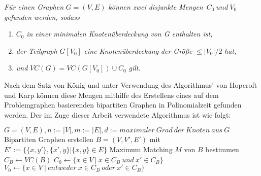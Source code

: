\textit{Für einen Graphen} $G=(V,E)$ \textit{können zwei disjunkte Mengen}\ $C_{0}\ und\ V_{0}$ \textit{gefunden werden, sodass}
\begin{enumerate}
\item $C_{0}$ \textit{ in einer minimalen Knotenüberdeckung von G enthalten ist,}
\item \textit{der Teilgraph }$G[V_{0}]$ \textit{eine Knotenüberdeckung} \textit{der Größe} $\leq |V_{0}| / 2$ \textit{ hat,}
\item \textit{und} $VC(G) = VC(G[V_{0}])\cup C_{0}$ \textit{ gilt.}
\end{enumerate}
Nach dem Satz von König und unter Verwendung des Algorithmus' von Hopcroft und Karp \cite{paper:6} können diese Mengen mithilfe des Erstellens eines auf dem Problemgraphen basierenden bipartiten Graphen in Polinomialzeit gefunden werden. Der im Zuge dieser Arbeit verwendete Algorithmus ist wie folgt:

\begin{algorithm}[caption={Nemhauser-Totter-Regel.}, label={alg1}]
$G = (V, E), n:= |V|, m:=|E|, d:= maximaler\ Grad\ der\ Knoten\ aus\ G$
Bipartiten Graphen erstellen $B = (V, V', E')$ 
  mit $E':= \{\{x,y'\}, \{x', y\} | \{x,y\} \in E\}$ 
Maximum Matching $M$ von $B$ bestimmen 
$C_{B} \leftarrow VC(B)$ 
$C_{0} \leftarrow \{x \in V\ |\ x \in C_{B}\ und\ x' \in C_{B} \}$ 
$V_{0} \leftarrow \{x \in V\ |\ entweder\ x \in C_{B}\ oder\ x' \in C_{B} \}$ 
\end{algorithm}

